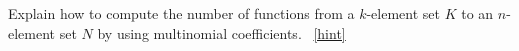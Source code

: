 \documentclass{book}
\begin{document}
\setcounter{project}{282}
\addtocounter{project}{-1}
\begin{activity}[]\label{activity-275}
\hypertarget{p-1472}{}%
Explain how to compute the number of functions from a \(k\)-element set \(K\) to an \(n\)-element set \(N\) by using multinomial coefficients.%
~\hfill{\tiny\hyperlink{a-282}{[hint]}\hypertarget{q-282}{}}\end{activity}
\end{document}
